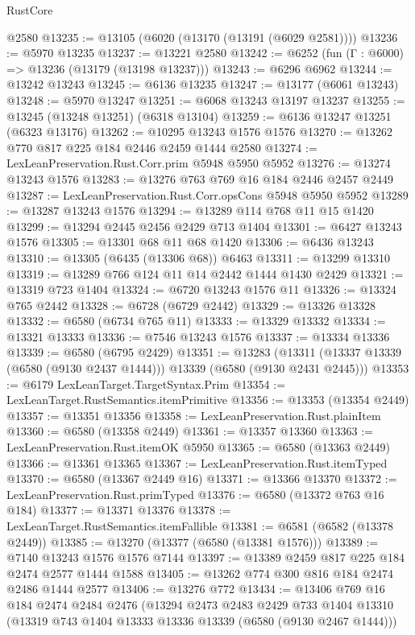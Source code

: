 \begin{lexlean}{RustCore}
\begin{coremodule}
{\begin{coremodule}
{{{{{{{{{{{{{{{{{{{{{{{{{{{{{{{{{{{{{{{{{{{{{    @2580
@13235 := @13105 (@6020 (@13170 (@13191 (@6029 @2581))))
@13236 := @5970 @13235
@13237 := @13221 @2580
@13242 := @6252 (fun (Γ : @6000) => @13236 (@13179 (@13198 @13237)))
@13243 := @6296 @6962
@13244 := @13242 @13243
@13245 := @6136 @13235
@13247 := @13177 (@6061 @13243)
@13248 := @5970 @13247
@13251 := @6068 @13243 @13197 @13237
@13255 := @13245 (@13248 @13251) (@6318 @13104)
@13259 := @6136 @13247 @13251 (@6323 @13176)
@13262 := @10295 @13243 @1576 @1576
@13270 := @13262 @770 @817 @225 @184 @2446 @2459 @1444 @2580
@13274 := LexLeanPreservation.Rust.Corr.prim @5948 @5950 @5952
@13276 := @13274 @13243 @1576
@13283 := @13276 @763 @769 @16 @184 @2446 @2457 @2449
@13287 := LexLeanPreservation.Rust.Corr.opsCons @5948 @5950 @5952
@13289 := @13287 @13243 @1576
@13294 := @13289 @114 @768 @11 @15 @1420
@13299 := @13294 @2445 @2456 @2429 @713 @1404
@13301 := @6427 @13243 @1576
@13305 := @13301 @68 @11 @68 @1420
@13306 := @6436 @13243
@13310 := @13305 (@6435 (@13306 @68)) @6463
@13311 := @13299 @13310
@13319 := @13289 @766 @124 @11 @14 @2442 @1444 @1430 @2429
@13321 := @13319 @723 @1404
@13324 := @6720 @13243 @1576 @11
@13326 := @13324 @765 @2442
@13328 := @6728 (@6729 @2442)
@13329 := @13326 @13328
@13332 := @6580 (@6734 @765 @11)
@13333 := @13329 @13332
@13334 := @13321 @13333
@13336 := @7546 @13243 @1576
@13337 := @13334 @13336
@13339 := @6580 (@6795 @2429)
@13351 := @13283
    (@13311 (@13337 @13339 (@6580 (@9130 @2437 @1444))) @13339 (@6580 (@9130 @2431 @2445)))
@13353 := @6179 LexLeanTarget.TargetSyntax.Prim
@13354 := LexLeanTarget.RustSemantics.itemPrimitive
@13356 := @13353 (@13354 @2449)
@13357 := @13351 @13356
@13358 := LexLeanPreservation.Rust.plainItem
@13360 := @6580 (@13358 @2449)
@13361 := @13357 @13360
@13363 := LexLeanPreservation.Rust.itemOK @5950
@13365 := @6580 (@13363 @2449)
@13366 := @13361 @13365
@13367 := LexLeanPreservation.Rust.itemTyped
@13370 := @6580 (@13367 @2449 @16)
@13371 := @13366 @13370
@13372 := LexLeanPreservation.Rust.primTyped
@13376 := @6580 (@13372 @763 @16 @184)
@13377 := @13371 @13376
@13378 := LexLeanTarget.RustSemantics.itemFallible
@13381 := @6581 (@6582 (@13378 @2449))
@13385 := @13270 (@13377 (@6580 (@13381 @1576)))
@13389 := @7140 @13243 @1576 @1576 @7144
@13397 := @13389 @2459 @817 @225 @184 @2474 @2577 @1444 @1588
@13405 := @13262 @774 @300 @816 @184 @2474 @2486 @1444 @2577
@13406 := @13276 @772
@13434 := @13406
    @769
    @16
    @184
    @2474
    @2484
    @2476
    (@13294
      @2473
      @2483
      @2429
      @733
      @1404
      @13310
      (@13319 @743 @1404 @13333 @13336 @13339 (@6580 (@9130 @2467 @1444)))
}}}}}}}}}}}}}}}}}}}}}}}}}}}}}}}}}}}}}}}}}}}}}
\end{coremodule}}
\end{coremodule}
\end{lexlean}
